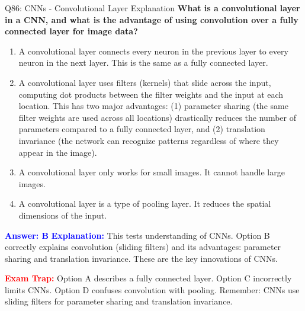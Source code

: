 \documentclass[8pt]{beamer}
\begin{document}
	\begin{frame}{Q86: CNNs - Convolutional Layer Explanation}
		\fontsize{6.5}{7.5}\selectfont
		\textbf{What is a convolutional layer in a CNN, and what is the advantage of using convolution over a fully connected layer for image data?}
		
		\begin{enumerate}
			\item A convolutional layer connects every neuron in the previous layer to every neuron in the next layer. This is the same as a fully connected layer.
			\item A convolutional layer uses filters (kernels) that slide across the input, computing dot products between the filter weights and the input at each location. This has two major advantages: (1) parameter sharing (the same filter weights are used across all locations) drastically reduces the number of parameters compared to a fully connected layer, and (2) translation invariance (the network can recognize patterns regardless of where they appear in the image).
			\item A convolutional layer only works for small images. It cannot handle large images.
			\item A convolutional layer is a type of pooling layer. It reduces the spatial dimensions of the input.
		\end{enumerate}
		
		\vspace{0.1cm}
		\textcolor{blue}{\textbf{Answer: B}}
		\vspace{0.1cm}
		\textcolor{blue}{\textbf{Explanation:}} This tests understanding of CNNs. Option B correctly explains convolution (sliding filters) and its advantages: parameter sharing and translation invariance. These are the key innovations of CNNs.
		
		\textcolor{red}{\textbf{Exam Trap:}} Option A describes a fully connected layer. Option C incorrectly limits CNNs. Option D confuses convolution with pooling. Remember: CNNs use sliding filters for parameter sharing and translation invariance.
	\end{frame}
	
\end{document}
